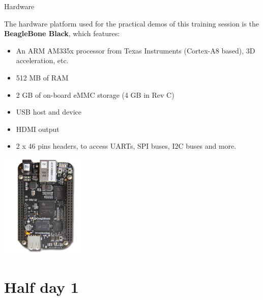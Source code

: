 \documentclass[a4paper,12pt,obeyspaces,spaces,hyphens]{article}
\begin{document}
\feagendatwocolumn
{Hardware}
{
  The hardware platform used for the practical demos of this training
  session is the {\bf BeagleBone Black}, which features:

  \begin{itemize}
  \item An ARM AM335x processor from Texas Instruments (Cortex-A8
    based), 3D acceleration, etc.
  \item 512 MB of RAM
  \item 2 GB of on-board eMMC storage
	\newline(4 GB in Rev C)
  \item USB host and device
  \item HDMI output
  \item 2 x 46 pins headers, to access UARTs, SPI buses, I2C buses
    and more.
  \end{itemize}
}
{}
{
  \begin{center}
    \includegraphics[height=5cm]{../slides/beagleboneblack-board/beagleboneblack.png}
  \end{center}
}

\section{Half day 1}
\end{document}
